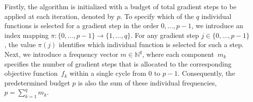 \documentclass[11pt,a4paper]{article}
\numberwithin{equation}{section}%
\renewcommand{\(}{\left (}
\renewcommand{\)}{\right )}
\begin{document}
Firstly, the algorithm is initialized with a budget of total gradient steps to be applied at each iteration, denoted by $p$. 
To specify which of the $q$ individual functions is selected for a gradient step in the order $0, \dots, p-1$, we introduce an index mapping $\pi : \{0, \dots, p-1\} \to \{1, \dots, q\}$. 
For any gradient step $j \in \{ 0, \dots, p-1\}$, the value $\pi(j)$ identifies which individual function is selected for such a step.
Next, we introduce a frequency vector $m \in \mathbb{N}^q$, where each component~$m_k$ specifies the number of gradient steps that is allocated to the corresponding objective function~$f_k$ within a single cycle from 0 to $p-1$. Consequently, the predetermined budget $p$ is also the sum of these individual frequencies,  $p = \sum_{k=1}^q m_k$.
\end{document}
